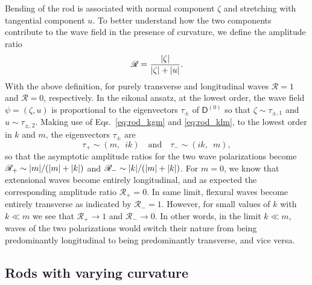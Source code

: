 Bending of the rod is associated with normal component $\zeta$ and stretching with tangential component $u$.
To better understand how the two components contribute to the wave field in the presence of curvature, we define the amplitude ratio
%
\begin{equation}
  \mathscr{R} = \frac{\lvert\zeta\rvert}{\lvert\zeta\rvert + \lvert u\rvert}.
  \label{eq:rod_ratio}
\end{equation}
%
With the above definition, for purely transverse and longitudinal waves $\mathscr{R} = 1$ and $\mathscr{R} = 0$, respectively.
In the eikonal ansatz, at the lowest order, the wave field $\psi = (\zeta, u)$ is proportional to the eigenvectors $\tau_{\pm}$ of $\mathsf{D}^{(0)}$ so that $\zeta \sim \tau_{\pm,1}$ and $u \sim \tau_{\pm,2}$.
Making use of Eqs.~\eqref{eq:rod_kgm} and \eqref{eq:rod_klm}, to the lowest order in $k$ and $m$, the eigenvectors $\tau_{\pm}$ are
%
\begin{equation}
  \tau_{+} \sim \left(m,\enspace ik\right)
  \quad\text{and}\quad
  \tau_{-} \sim \left(ik,\enspace m\right),
  \label{eq:rod_tau}
\end{equation}
%
so that the asymptotic amplitude ratios for the two wave polarizations become $\mathscr{R}_{+} \sim \lvert m\rvert/(\lvert m\rvert + \lvert k\rvert)$ and $\mathscr{R}_{-} \sim \lvert k\rvert/(\lvert m\rvert + \lvert k\rvert)$.
For $m = 0$, we know that extensional waves become entirely longitudinal, and as expected the corresponding amplitude ratio $\mathscr{R}_{+} = 0$.
In same limit, flexural waves become entirely transverse as indicated by $\mathscr{R}_{-} = 1$.
However, for small values of $k$ with $k \ll m$ we see that $\mathscr{R}_{+} \to 1$ and $\mathscr{R}_{-} \to 0$.
In other words, in the limit $k \ll m$, waves of the two polarizations would switch their nature from being predominantly longitudinal to being predominantly transverse, and vice versa.

\subsection{Rods with varying curvature}

